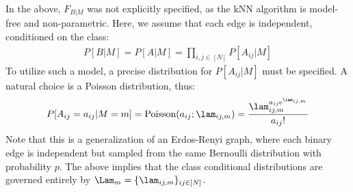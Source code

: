 In the above, $F_{B|M}$ was not explicitly specified, as the kNN algorithm is model-free and non-parametric.  Here, we assume that each edge is independent, conditioned on the class:
\begin{align}
	P[B|M]=P[A|M]=\prod_{i,j \in [N]} P[A_{ij} | M]
\end{align}
To utilize such a model, a precise distribution for $P[A_{ij}|M]$ must be specified.  A natural choice is a Poisson distribution, thus:
\begin{align}
	P[A_{ij}=a_{ij} |M=m]=\text{Poisson}(a_{ij}; \lam_{ij,m}) = \frac{\lam_{ij,m}^{a_{ij} \text{e}^{\lam_{ij,m}}}}{a_{ij}!}
\end{align}
Note that this is a generalization of an Erdos-Renyi graph, where each binary edge is independent but sampled from the same Bernoulli distribution with probability $p$.  The above implies that the class conditional distributions are governed entirely by $\Lam_m=\{\lam_{ij,m}\}_{ij \in [N]}$.  

